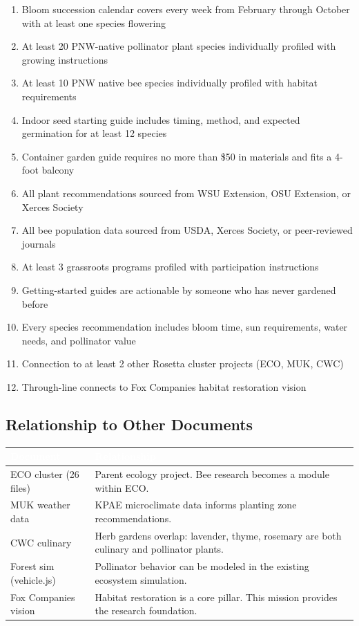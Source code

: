 \documentclass[11pt,letterpaper]{article}
\newcommand{\tableheader}[1]{\textbf{\sffamily\textcolor{white}{#1}}}
\begin{document}
\begin{enumerate}
  \item Bloom succession calendar covers every week from February through October with at least one species flowering
  \item At least 20 PNW-native pollinator plant species individually profiled with growing instructions
  \item At least 10 PNW native bee species individually profiled with habitat requirements
  \item Indoor seed starting guide includes timing, method, and expected germination for at least 12 species
  \item Container garden guide requires no more than \$50 in materials and fits a 4-foot balcony
  \item All plant recommendations sourced from WSU Extension, OSU Extension, or Xerces Society
  \item All bee population data sourced from USDA, Xerces Society, or peer-reviewed journals
  \item At least 3 grassroots programs profiled with participation instructions
  \item Getting-started guides are actionable by someone who has never gardened before
  \item Every species recommendation includes bloom time, sun requirements, water needs, and pollinator value
  \item Connection to at least 2 other Rosetta cluster projects (ECO, MUK, CWC)
  \item Through-line connects to Fox Companies habitat restoration vision
\end{enumerate}

\subsection{Relationship to Other Documents}

\begin{center}
\begin{tabularx}{\textwidth}{L{4cm}X}
\toprule
{}
\tableheader{Document} & \tableheader{Relationship} \\
\midrule
ECO cluster (26 files) & Parent ecology project. Bee research becomes a module within ECO. \\
MUK weather data & KPAE microclimate data informs planting zone recommendations. \\
CWC culinary & Herb gardens overlap: lavender, thyme, rosemary are both culinary and pollinator plants. \\
Forest sim (vehicle.js) & Pollinator behavior can be modeled in the existing ecosystem simulation. \\
Fox Companies vision & Habitat restoration is a core pillar. This mission provides the research foundation. \\
\bottomrule
\end{tabularx}
\end{center}
\end{document}
